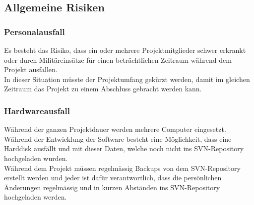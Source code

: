 \subsection{Allgemeine Risiken}
\subsubsection{Personalausfall} \label{subsec:Risiken-Personalausfall}
Es besteht das Risiko, dass ein oder mehrere Projektmitglieder schwer erkrankt oder durch Militäreinsätze für einen beträchtlichen Zeitraum während dem Projekt ausfallen. \\
In dieser Situation müsste der Projektumfang gekürzt werden, damit im gleichen Zeitraum das Projekt zu einem Abschluss gebracht werden kann.

\subsubsection{Hardwareausfall} \label{subsec:Risiken-Hardwareausfall}
Während der ganzen Projektdauer werden mehrere Computer eingesetzt. Während der Entwicklung der Software besteht eine Möglichkeit, dass eine Harddisk ausfällt und mit dieser Daten, welche noch nicht ins SVN-Repository hochgeladen wurden. \\
Während dem Projekt müssen regelmässig Backups von dem SVN-Repository erstellt werden und jeder ist dafür verantwortlich, dass die persönlichen Änderungen regelmässig und in kurzen Abständen ins SVN-Repository hochgeladen werden.

